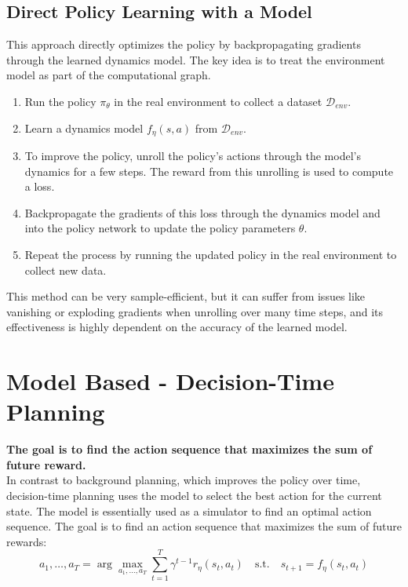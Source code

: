 \documentclass[12pt]{article}
\begin{document}
\subsection{Direct Policy Learning with a Model }
This approach directly optimizes the policy by backpropagating gradients through the learned dynamics model. The key idea is to treat the environment model as part of the computational graph.
\begin{enumerate}
    \item Run the policy $\pi_\theta$ in the real environment to collect a dataset $\mathcal{D}_{env}$.
    \item Learn a dynamics model $f_\eta(s,a)$ from $\mathcal{D}_{env}$.
    \item To improve the policy, unroll the policy's actions through the model's dynamics for a few steps. The reward from this unrolling is used to compute a loss.
    \item Backpropagate the gradients of this loss through the dynamics model and into the policy network to update the policy parameters $\theta$.
    \item Repeat the process by running the updated policy in the real environment to collect new data.
\end{enumerate}
This method can be very sample-efficient, but it can suffer from issues like vanishing or exploding gradients when unrolling over many time steps, and its effectiveness is highly dependent on the accuracy of the learned model.


\section{Model Based - Decision-Time Planning}
\textbf{The goal is to find the action sequence that maximizes the sum of future reward.
}\\
In contrast to background planning, which improves the policy over time, decision-time planning uses the model to select the best action for the current state. The model is essentially used as a simulator to find an optimal action sequence. The goal is to find an action sequence that maximizes the sum of future rewards:
$$ a_1, \dots, a_T = \arg\max_{a_1,\dots,a_T} \sum_{t=1}^T \gamma^{t-1} r_\eta(s_t, a_t) \quad \text{s.t.} \quad s_{t+1} = f_\eta(s_t, a_t) $$
\end{document}
